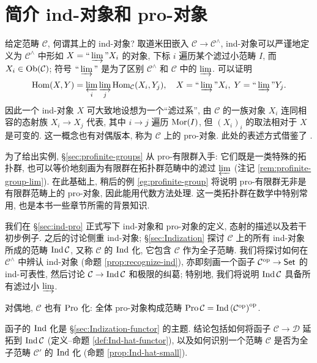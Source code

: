 

\chapter{简介 ind-对象和 pro-对象}\label{sec:app-Ind}
给定范畴 $\mathcal{C}$, 何谓其上的 ind-对象? 取道米田嵌入 $\mathcal{C} \to \mathcal{C}^{\wedge}$, ind-对象可以严谨地定义为 $\mathcal{C}^\wedge$ 中形如 $X = \Yinjlim X_i$ 的对象, 下标 $i$ 遍历某个滤过小范畴 $I$, 而 $X_i \in \operatorname{Ob}(\mathcal{C})$; 符号 $\Yinjlim$ 是为了区别 $\mathcal{C}^{\wedge}$ 和 $\mathcal{C}$ 中的 $\varinjlim$. 可以证明
\[ \Hom(X, Y) = \varprojlim_i \varinjlim_j \Hom_{\mathcal{C}}(X_i, Y_j), \quad X = \Yinjlim X_i, \; Y = \Yinjlim Y_j. \]
因此一个 ind-对象 $X$ 可大致地设想为一个``滤过系'', 由 $\mathcal{C}$ 的一族对象 $X_i$ 连同相容的态射族 $X_i \to X_j$ 代表, 其中 $i \to j$ 遍历 $\operatorname{Mor}(I)$, 但 $(X_i)_i$ 的取法相对于 $X$ 是可变的. 这一概念也有对偶版本, 称为 $\mathcal{C}$ 上的 pro-对象. 此处的表述方式借鉴了 \cite{KS06}.

为了给出实例, \S\ref{sec:profinite-groups} 从 pro-有限群入手: 它们既是一类特殊的拓扑群, 也可以等价地刻画为有限群在拓扑群范畴中的滤过 $\varprojlim$ (注记 \ref{rem:profinite-group-lim}). 在此基础上, 稍后的例 \ref{eg:profinite-group} 将说明 pro-有限群无非是有限群范畴上的 pro-对象, 因此能用代数方法处理. 这一类拓扑群在数学中特别常用, 也是本书一些章节所需的背景知识.

我们在 \S\ref{sec:ind-pro} 正式写下 ind-对象和 pro-对象的定义, 态射的描述以及若干初步例子. 之后的讨论侧重 ind-对象; \S\ref{sec:Indization} 探讨 $\mathcal{C}$ 上的所有 ind-对象所成的范畴 $\operatorname{Ind}\mathcal{C}$, 又称 $\mathcal{C}$ 的 $\operatorname{Ind}$ 化, 它包含 $\mathcal{C}$ 作为全子范畴. 我们将探讨如何在 $\mathcal{C}^{\wedge}$ 中辨认 ind-对象 (命题 \ref{prop:recognize-ind}), 亦即刻画一个函子 $\mathcal{C}^{\operatorname{op}} \to \mathsf{Set}$ 的 ind-可表性, 然后讨论 $\mathcal{C} \to \operatorname{Ind}\mathcal{C}$ 和极限的纠葛; 特别地, 我们将说明 $\operatorname{Ind}\mathcal{C}$ 具备所有滤过小 $\varinjlim$.

对偶地, $\mathcal{C}$ 也有 $\operatorname{Pro}$ 化: 全体 pro-对象构成范畴 $\operatorname{Pro}\mathcal{C} = \operatorname{Ind}\left(\mathcal{C}^{\operatorname{op}}\right)^{\operatorname{op}}$.

函子的 $\operatorname{Ind}$ 化是 \S\ref{sec:Indization-functor} 的主题. 结论包括如何将函子 $\mathcal{C} \to \mathcal{D}$ 延拓到 $\operatorname{Ind}\mathcal{C}$ (定义--命题 \ref{def:Ind-hat-functor}), 以及如何识别一个范畴 $\mathcal{C}$ 是否为全子范畴 $\mathcal{C}'$ 的 $\operatorname{Ind}$ 化 (命题 \ref{prop:Ind-hat-small}).

